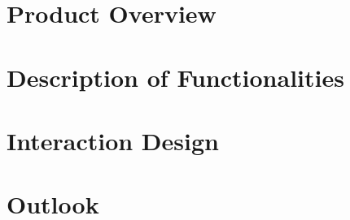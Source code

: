 \chapter{Product Overview}



\chapter{Description of Functionalities}

\chapter{Interaction Design}



\chapter{Outlook}